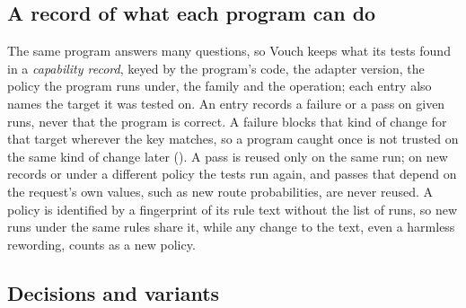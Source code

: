 \subsection{A record of what each program can do}
\label{sec:method:registry}

The same program answers many questions, so Vouch keeps what its tests found in a \emph{capability record}, keyed by the program's code, the adapter version, the policy the program runs under, the family and the operation; each entry also names the target it was tested on. An entry records a failure or a pass on given runs, never that the program is correct. A failure blocks that kind of change for that target wherever the key matches, so a program caught once is not trusted on the same kind of change later (\Already). A pass is reused only on the same run; on new records or under a different policy the tests run again, and passes that depend on the request's own values, such as new route probabilities, are never reused. A policy is identified by a fingerprint of its rule text without the list of runs, so new runs under the same rules share it, while any change to the text, even a harmless rewording, counts as a new policy.

\subsection{Decisions and variants}
\label{sec:method:terms}

